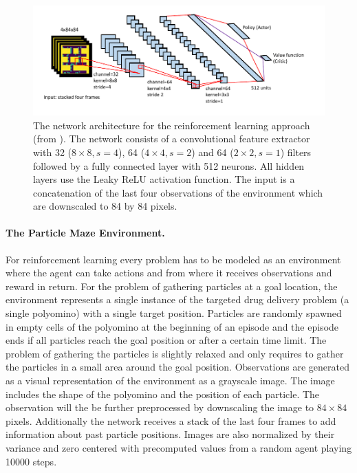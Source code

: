 \begin{figure}[ht]
    
    \begin{center}
        \includegraphics[clip, width=0.95\columnwidth]{figures/drugdelivery/Network_Architecture.pdf}
    \end{center}
    
    \caption[Network Architecture for the RL Approach]{The network architecture for the reinforcement learning approach (from \cite{huang2019}). The network consists of a convolutional feature extractor with 32 ($8\times 8, s=4$), 64 ($4\times 4, s=2$) and 64 ($2\times 2, s=1$) filters followed by a fully connected layer with 512 neurons. All hidden layers use the Leaky ReLU activation function. The input is a concatenation of the last four observations of the environment which are downscaled to 84 by 84 pixels.}
    \label{fig:huang_network_architecture}
\end{figure}

\paragraph{The Particle Maze Environment.}
For reinforcement learning every problem has to be modeled as an environment where the agent can take actions and from where it receives observations and reward in return. For the problem of gathering particles at a goal location, the environment represents a single instance of the targeted drug delivery problem (a single polyomino) with a single target position. Particles are randomly spawned in empty cells of the polyomino at the beginning of an episode and the episode ends if all particles reach the goal position or after a certain time limit. The problem of gathering the particles is slightly relaxed and only requires to gather the particles in a small area around the goal position. Observations are generated as a visual representation of the environment as a grayscale image. The image includes the shape of the polyomino and the position of each particle. The observation will the be further preprocessed by downscaling the image to $84 \times 84$ pixels. Additionally the network receives a stack of the last four frames to add information about past particle positions. Images are also normalized by their variance and zero centered with precomputed values from a random agent playing 10000 steps.

